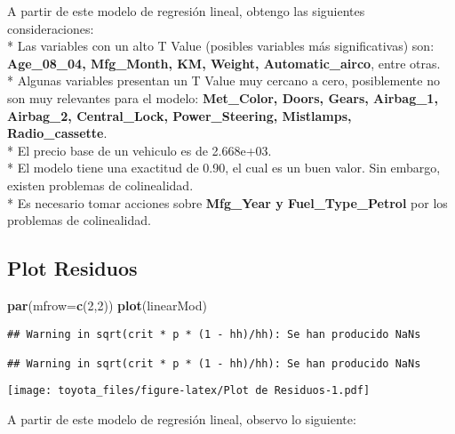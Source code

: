 \documentclass[]{article}
\newenvironment{Shaded}{\begin{snugshade}}{\end{snugshade}}
\newcommand{\DataTypeTok}[1]{\textcolor[rgb]{0.13,0.29,0.53}{#1}}
\newcommand{\DecValTok}[1]{\textcolor[rgb]{0.00,0.00,0.81}{#1}}
\newcommand{\KeywordTok}[1]{\textcolor[rgb]{0.13,0.29,0.53}{\textbf{#1}}}
\newcommand{\NormalTok}[1]{#1}
\begin{document}
A partir de este modelo de regresión lineal, obtengo las siguientes
consideraciones:\\
* Las variables con un alto T Value (posibles variables más
significativas) son: \textbf{Age\_08\_04, Mfg\_Month, KM, Weight,
Automatic\_airco}, entre otras.\\
* Algunas variables presentan un T Value muy cercano a cero,
posiblemente no son muy relevantes para el modelo: \textbf{Met\_Color,
Doors, Gears, Airbag\_1, Airbag\_2, Central\_Lock, Power\_Steering,
Mistlamps, Radio\_cassette}.\\
* El precio base de un vehiculo es de 2.668e+03.\\
* El modelo tiene una exactitud de 0.90, el cual es un buen valor. Sin
embargo, existen problemas de colinealidad.\\
* Es necesario tomar acciones sobre \textbf{Mfg\_Year y
Fuel\_Type\_Petrol} por los problemas de colinealidad.

\hypertarget{plot-residuos}{%
\subsection{Plot Residuos}\label{plot-residuos}}

\begin{Shaded}
\begin{Highlighting}[]
\KeywordTok{par}\NormalTok{(}\DataTypeTok{mfrow=}\KeywordTok{c}\NormalTok{(}\DecValTok{2}\NormalTok{,}\DecValTok{2}\NormalTok{))}
\KeywordTok{plot}\NormalTok{(linearMod)}
\end{Highlighting}
\end{Shaded}

\begin{verbatim}
## Warning in sqrt(crit * p * (1 - hh)/hh): Se han producido NaNs

## Warning in sqrt(crit * p * (1 - hh)/hh): Se han producido NaNs
\end{verbatim}

\texttt{[image: toyota\_files/figure-latex/Plot de Residuos-1.pdf]}

A partir de este modelo de regresión lineal, observo lo siguiente:
\end{document}
